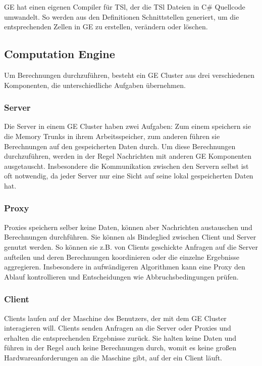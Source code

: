 GE hat einen eigenen Compiler für TSl, der die TSl Dateien in C\# Quellcode umwandelt. So werden aus den Definitionen Schnittstellen
generiert, um die entsprechenden Zellen in GE zu erstellen, verändern oder löschen. 

\subsection{Computation Engine}

Um Berechnungen durchzuführen, besteht ein GE Cluster aus drei verschiedenen Komponenten, die unterschiedliche Aufgaben übernehmen.


\subsubsection{Server}

Die Server in einem GE Cluster haben zwei Aufgaben: Zum einem speichern sie die Memory Trunks in ihrem Arbeitsspeicher, 
zum anderen führen sie Berechnungen auf den gespeicherten Daten durch.
Um diese Berechnungen durchzuführen, werden in der Regel Nachrichten mit anderen GE Komponenten ausgetauscht. Insbesondere die Kommunikation zwischen den Servern
selbst ist oft notwendig, da jeder Server nur eine Sicht auf seine lokal gespeicherten Daten hat.

\subsubsection{Proxy}

Proxies speichern selber keine Daten, können aber Nachrichten austauschen und Berechnungen durchführen. Sie können als 
Bindeglied zwischen Client und Server genutzt werden. So können sie z.B. von Clients geschickte Anfragen auf die Server aufteilen und deren
Berechnungen koordinieren oder die einzelne Ergebnisse aggregieren. Insbesondere in aufwändigeren Algorithmen kann eine Proxy 
den Ablauf kontrollieren und Entscheidungen wie Abbruchsbedingungen prüfen.

\subsubsection{Client}

Clients laufen auf der Maschine des Benutzers, der mit dem GE Cluster interagieren will. Clients senden Anfragen an die Server oder Proxies und
erhalten die entsprechenden Ergebnisse zurück. Sie halten keine Daten und führen in der Regel auch keine Berechnungen durch, womit es keine großen Hardwareanforderungen
an die Maschine gibt, auf der ein Client läuft.

